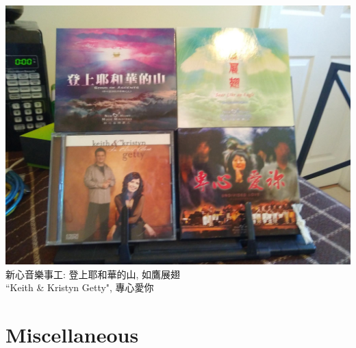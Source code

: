 \documentclass[t]{beamer}
\newcommand{\htarget}[2]{\hypertarget{#1}{#2}}
\begin{document}
\begin{frame}\htarget{getty}{} \begin{center}
\includegraphics[height=0.8\textheight]{dvd06_mini.jpg} \\
新心音樂事工: 登上耶和華的山, 如鷹展翅 \\
``Keith \& Kristyn Getty", 專心愛你
\end{center} \end{frame}
\section{Miscellaneous}
\end{document}
